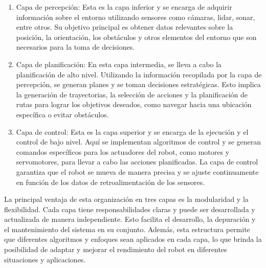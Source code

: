 \documentclass{article}
\begin{document}
\begin{itemize}
  \begin{enumerate}
  \item Capa de percepción: Esta es la capa inferior y se encarga de adquirir información sobre el entorno utilizando sensores como cámaras, lidar, sonar, entre otros. Su objetivo principal es obtener datos relevantes sobre la posición, la orientación, los obstáculos y otros elementos del entorno que son necesarios para la toma de decisiones.
  \item Capa de planificación: En esta capa intermedia, se lleva a cabo la planificación de alto nivel. Utilizando la información recopilada por la capa de percepción, se generan planes y se toman decisiones estratégicas. Esto implica la generación de trayectorias, la selección de acciones y la planificación de rutas para lograr los objetivos deseados, como navegar hacia una ubicación específica o evitar obstáculos.
  \item Capa de control: Esta es la capa superior y se encarga de la ejecución y el control de bajo nivel. Aquí se implementan algoritmos de control y se generan comandos específicos para los actuadores del robot, como motores y servomotores, para llevar a cabo las acciones planificadas. La capa de control garantiza que el robot se mueva de manera precisa y se ajuste continuamente en función de los datos de retroalimentación de los sensores.
  \end{enumerate}

  La principal ventaja de esta organización en tres capas es la modularidad y la flexibilidad. Cada capa tiene responsabilidades claras y puede ser desarrollada y actualizada de manera independiente. Esto facilita el desarrollo, la depuración y el mantenimiento del sistema en su conjunto. Además, esta estructura permite que diferentes algoritmos y enfoques sean aplicados en cada capa, lo que brinda la posibilidad de adaptar y mejorar el rendimiento del robot en diferentes situaciones y aplicaciones.\\
    
\end{itemize}
  
\end{document}
